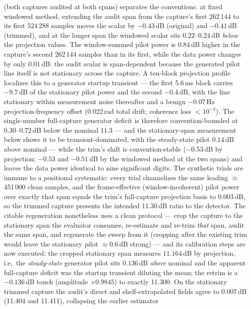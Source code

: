 (both captures audited at both spans) separates the conventions: at
fixed windowed method, extending the audit span from the capture's
first $262\,144$ to its first $524\,288$ samples moves the scalar by
$-0.43$\,dB (original) and $-0.41$\,dB (trimmed), and at the longer
span the windowed scalar sits $0.22$--$0.24$\,dB \emph{below} the
projection values. The window-summed pilot power is $0.84$\,dB higher
in the capture's second $262\,144$ samples than in its first, while
the data power changes by only $0.01$\,dB: the audit scalar is
span-dependent because the generated pilot line itself is not
stationary across the capture. A ten-block projection profile
localizes this to a generator startup transient --- the first
5.6\,ms block carries $-9.7$\,dB of the stationary pilot power and
the second $-0.4$\,dB, with the line stationary within measurement
noise thereafter and a benign $-0.07$\,Hz projection-frequency offset
(0.022\,rad total drift; coherence loss $<10^{-4}$). The single-number full-capture generator deficit is
therefore convention-bounded at $0.30$--$0.72$\,dB below the nominal
11.3 --- and the stationary-span measurement below shows it to be
transient-dominated, with the steady-state pilot $0.14$\,dB above
nominal --- while the trim's shift is convention-stable ($-0.53$\,dB by
projection; $-0.53$ and $-0.51$\,dB by the windowed method at the two
spans) and leaves the data power identical to nine significant
digits. The synthetic trials are immune to a positional systematic:
every trial channelizes the same leading $\approx$451\,000 clean
samples, and the frame-effective (window-incoherent) pilot power over
exactly that span equals the trim's full-capture projection basis to
$0.003$\,dB, so the trimmed capture presents the intended 11.30\,dB
ratio to the detector. The citable regeneration nonetheless uses a
clean protocol --- crop the capture to the stationary span the
evaluator consumes, re-estimate and re-trim \emph{that} span, audit
the same span, and regenerate the sweep from it (cropping after the
existing trim would leave the stationary pilot $\approx 0.6$\,dB
strong) --- and its calibration steps are now executed: the cropped
stationary span measures $11.164$\,dB by projection, i.e.\ the
\emph{steady-state} generator pilot sits $0.136$\,dB \emph{above}
nominal and the apparent full-capture deficit was the startup
transient diluting the mean; the retrim is a $-0.136$\,dB touch
(amplitude $\times 0.9845$) to exactly 11.300. On the stationary
trimmed capture the audit's direct and shelf-extrapolated fields agree
to $0.007$\,dB (11.404 and 11.411), collapsing the earlier estimator

